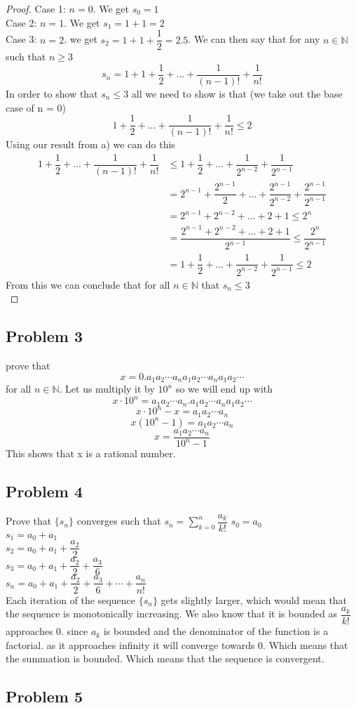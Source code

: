 \documentclass[12pt]{article}
\newcommand{\N}{\mathbb{N}}
\begin{document}
\begin{proof}
Case 1: $n = 0$. We get $s_0 = 1$\\
Case 2: $n = 1$. We get $s_1 = 1 + 1 = 2$ \\
Case 3: $n = 2$. we get $s_2 = 1 + 1 + \dfrac{1}{2} = 2.5$. We can then say that for any $n \in \N$ such that $n \geq 3$
\[ s_n = 1 + 1 + \dfrac{1}{2} + ... + \dfrac{1}{(n-1)!} + \dfrac{1}{n!} \]
In order to show that $s_n \leq 3$ all we need to show is that (we take out the base case of n = 0)
\[ 1 + \dfrac{1}{2} + ... + \dfrac{1}{(n-1)!} + \dfrac{1}{n!} \leq 2 \]
Using our result from a) we can do this
\begin{align*}
1 + \dfrac{1}{2} + ... + \dfrac{1}{(n-1)!} + \dfrac{1}{n!} &\leq 1 + \dfrac{1}{2} + ... + \dfrac{1}{2^{n-2}} + \dfrac{1}{2^{n-1}} \\
&= 2^{n-1} + \dfrac{2^{n-1}}{2} + ... + \dfrac{2^{n-1}}{2^{n-2}} + \dfrac{2^{n-1}}{2^{n-1}} \\
&= 2^{n-1} + 2^{n-2} + ... + 2 + 1 \leq 2^{n} \\
&= \dfrac{2^{n-1} + 2^{n-2} + ... + 2 + 1}{2^{n-1}} \leq \dfrac{2^n}{2^{n-1}} \\
&= 1 + \dfrac{1}{2} + ... + \dfrac{1}{2^{n-2}} + \dfrac{1}{2^{n-1}} \leq 2
\end{align*}
From this we can conclude that for all $n \in \N$ that $s_n \leq 3$\\
\end{proof}
\subsection*{Problem 3}
prove that 
\[ x = 0.a_1a_2 \cdots a_na_1a_2 \cdots a_na_1a_2 \cdots \]
for all $n \in \N$. Let us multiply it by $10^n$ so we will end up with
\[ x \cdot 10^n = a_1a_2 \cdots a_n.a_1a_2 \cdots a_na_1a_2 \cdots \]
\[ x \cdot 10^n - x = a_1a_2 \cdots a_n \]
\[x(10^n - 1) = a_1a_2 \cdots a_n\]
\[ x = \dfrac{a_1a_2 \cdots a_n}{10^n - 1} \]
This shows that x is a rational number.
\newpage
\subsection*{Problem 4}
Prove that $\{s_n\}$ converges such that $s_n = \sum^{n}_{k=0} \dfrac{a_k}{k!}$
$s_0 = a_0$\\
$s_1 = a_0 + a_1$\\
$s_2 = a_0 + a_1 + \dfrac{a_2}{2}$ \\
$s_3 = a_0 + a_1 + \dfrac{a_2}{2} + \dfrac{a_3}{6}$ \\
$s_n = a_0 + a_1 + \dfrac{a_2}{2} + \dfrac{a_3}{6} + \cdots + \dfrac{a_n}{n!}$ \\
Each iteration of the sequence $\{ s_n \}$ gets slightly larger, which would mean that the sequence is monotonically increasing. We also know that it is bounded as $\dfrac{a_k}{k!}$ approaches 0. since $a_k$ is bounded and the denominator of the function is a factorial. as it approaches infinity it will converge towards 0. Which means that the summation is bounded. Which means that the sequence is convergent.
\subsection*{Problem 5}
\end{document}

